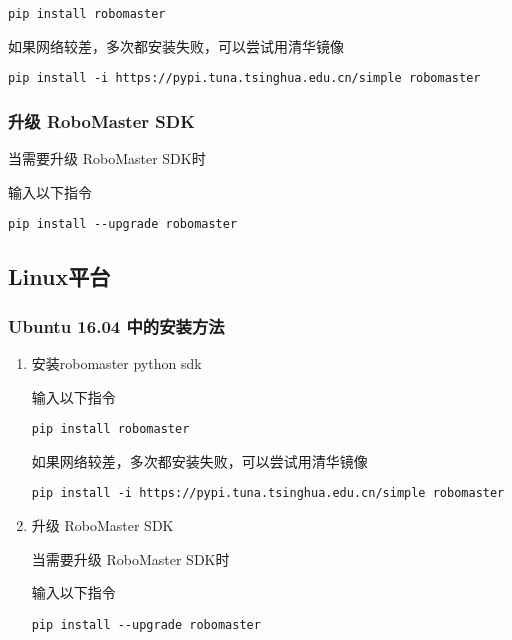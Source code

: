 \begin{lstlisting}[language=pythonC]
pip install robomaster
\end{lstlisting}

如果网络较差，多次都安装失败，可以尝试用清华镜像

\begin{lstlisting}[language=pythonC]
pip install -i https://pypi.tuna.tsinghua.edu.cn/simple robomaster
\end{lstlisting}

\subsubsection{升级 RoboMaster SDK}
当需要升级 RoboMaster SDK时

输入以下指令

\begin{lstlisting}[language=pythonC]
pip install --upgrade robomaster
\end{lstlisting}

\subsection{Linux平台}\label{sub_PyRM1_3}
\subsubsection{Ubuntu 16.04 中的安装方法}
\begin{enumerate}
\item 安装robomaster python sdk

输入以下指令

\begin{lstlisting}[language=pythonC]
pip install robomaster
\end{lstlisting}

如果网络较差，多次都安装失败，可以尝试用清华镜像

\begin{lstlisting}[language=pythonC]
pip install -i https://pypi.tuna.tsinghua.edu.cn/simple robomaster
\end{lstlisting}

\item 升级 RoboMaster SDK

当需要升级 RoboMaster SDK时

输入以下指令

\begin{lstlisting}[language=pythonC]
pip install --upgrade robomaster
\end{lstlisting}

\end{enumerate}
